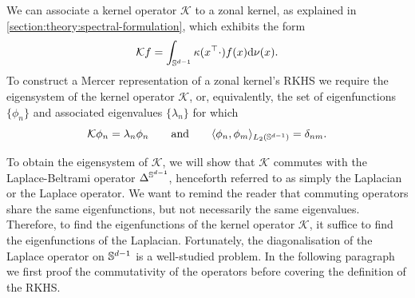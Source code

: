 

We can associate a kernel operator $\mathcal{K}$ to a zonal kernel, as explained in \cref{section:theory:spectral-formulation}, which exhibits the form
\begin{equation}
    \label{eq:kernel-operator-zonal}
  \mathcal{K} f = \int_{\mathbb{S}^{d-1}} \kappa(x^{\top}\cdot) f(x) \mathrm{d}{\nu(x)}.
\end{equation}
To construct a Mercer representation of a zonal kernel's RKHS we require the eigensystem of the kernel operator $\mathcal{K}$, or, equivalently, the set of eigenfunctions $\{\phi_n\}$ and associated eigenvalues $\{\lambda_n\}$ for which
\begin{equation}
    \mathcal{K} \phi_n = \lambda_n \phi_n\qquad\text{and}\qquad \langle \phi_n, \phi_m \rangle_{L_2(\mathbb{S}^{d-1})} = \delta_{nm}.
\end{equation}

To obtain the eigensystem of $\mathcal{K}$, we will show that $\mathcal{K}$ commutes with the Laplace-Beltrami operator $\Delta^{\mathbb{S}^{d-1}}$, henceforth referred to as simply the Laplacian or the Laplace operator. We want to remind the reader that commuting operators share the same eigenfunctions, but not necessarily the same eigenvalues. Therefore, to find the eigenfunctions of the kernel operator $\mathcal{K}$, it suffice to find the eigenfunctions of the Laplacian. Fortunately, the diagonalisation of the Laplace operator on $\mathbb{S}^{d-1}$ is a well-studied problem. In the following paragraph we first proof the commutativity of the operators before covering the definition of the RKHS.

